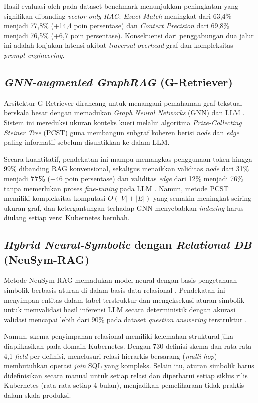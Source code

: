 Hasil evaluasi oleh \textcite{wan2025empowering} pada dataset benchmark menunjukkan peningkatan yang signifikan dibanding \textit{vector-only RAG}: \textit{Exact Match} meningkat dari 63,4\% menjadi 77,8\% (+14,4 poin persentase) dan \textit{Context Precision} dari 69,8\% menjadi 76,5\% (+6,7 poin persentase). Konsekuensi dari penggabungan dua jalur ini adalah lonjakan latensi akibat \textit{traversal overhead} graf dan kompleksitas \textit{prompt engineering}.

\subsection{\textit{GNN-augmented GraphRAG} (G-Retriever)}
Arsitektur G-Retriever dirancang untuk menangani pemahaman graf tekstual berskala besar dengan memadukan \textit{Graph Neural Networks} (GNN) dan LLM \parencite{he2024gretriever}. Sistem ini mereduksi ukuran konteks kueri melalui algoritma \textit{Prize-Collecting Steiner Tree} (PCST) guna membangun subgraf koheren berisi \textit{node} dan \textit{edge} paling informatif sebelum disuntikkan ke dalam LLM.

Secara kuantitatif, pendekatan ini mampu memangkas penggunaan token hingga 99\% dibanding RAG konvensional, sekaligus menaikkan validitas \textit{node} dari 31\% menjadi \textbf{77\%} (+46 poin persentase) dan validitas \textit{edge} dari 12\% menjadi 76\% tanpa memerlukan proses \textit{fine-tuning} pada LLM \parencite{he2024gretriever}. Namun, metode PCST memiliki kompleksitas komputasi $O(|V| + |E|)$ yang semakin meningkat seiring ukuran graf, dan ketergantungan terhadap GNN menyebabkan \textit{indexing} harus diulang setiap versi Kubernetes berubah.

\subsection{\textit{Hybrid Neural-Symbolic} dengan \textit{Relational DB} (NeuSym-RAG)}
Metode NeuSym-RAG memadukan model neural dengan basis pengetahuan simbolik berbasis aturan di dalam basis data relasional \parencite{cao2025neusymrag}. Pendekatan ini menyimpan entitas dalam tabel terstruktur dan mengeksekusi aturan simbolik untuk memvalidasi hasil inferensi LLM secara deterministik dengan akurasi validasi mencapai lebih dari 90\% pada dataset \textit{question answering} terstruktur \parencite{cao2025neusymrag}.

Namun, skema penyimpanan relasional memiliki kelemahan struktural jika diaplikasikan pada domain Kubernetes. Dengan 730 definisi skema dan rata-rata 4,1 \textit{field} per definisi, menelusuri relasi hierarkis bersarang (\textit{multi-hop}) membutuhkan operasi \textit{join} SQL yang kompleks. Selain itu, aturan simbolik harus didefinisikan secara manual untuk setiap relasi dan diperbarui setiap siklus rilis Kubernetes (rata-rata setiap 4 bulan), menjadikan pemeliharaan tidak praktis dalam skala produksi.

